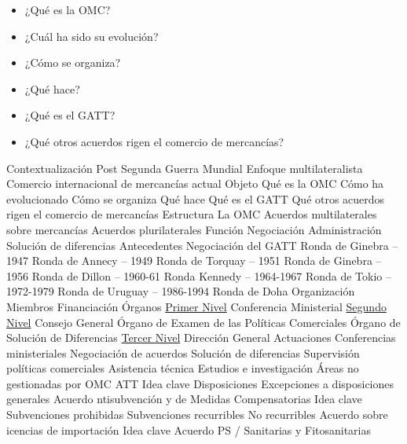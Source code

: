 \documentclass{nuevotema}
\begin{document}
\begin{itemize}
	\item ¿Qué es la OMC?
	\item ¿Cuál ha sido su evolución?
	\item ¿Cómo se organiza?
	\item ¿Qué hace?
	\item ¿Qué es el GATT?
	\item ¿Qué otros acuerdos rigen el comercio de mercancías?
\end{itemize}

\esquemacorto

\begin{esquema}[enumerate]
	\1[] 
		\2 Contextualización
			\3 Post Segunda Guerra Mundial
			\3 Enfoque multilateralista
			\3 Comercio internacional de mercancías actual
		\2 Objeto
			\3 Qué es la OMC
			\3 Cómo ha evolucionado
			\3 Cómo se organiza
			\3 Qué hace
			\3 Qué es el GATT
			\3 Qué otros acuerdos rigen el comercio de mercancías
		\2 Estructura
			\3 La OMC
			\3 Acuerdos multilaterales sobre mercancías
			\3 Acuerdos plurilaterales
	\1 
		\2 Función
			\3 Negociación
			\3 Administración
			\3 Solución de diferencias
		\2 Antecedentes
			\3 Negociación del GATT
			\3 Ronda de Ginebra -- 1947
			\3 Ronda de Annecy -- 1949
			\3 Ronda de Torquay -- 1951
			\3 Ronda de Ginebra -- 1956
			\3 Ronda de Dillon -- 1960-61
			\3 Ronda Kennedy -- 1964-1967
			\3 Ronda de Tokio -- 1972-1979
			\3 Ronda de Uruguay -- 1986-1994
			\3 Ronda de Doha
		\2 Organización
			\3 Miembros
			\3 Financiación
			\3 Órganos
			\3[] \underline{Primer Nivel}
			\3[I] Conferencia Ministerial
			\3 \underline{Segundo Nivel}
			\3[II] Consejo General
			\3[] Órgano de Examen de las Políticas Comerciales
			\3[] Órgano de Solución de Diferencias
			\3[] \underline{Tercer Nivel}
			\3[] Dirección General
		\2 Actuaciones
			\3 Conferencias ministeriales
			\3 Negociación de acuerdos
			\3 Solución de diferencias
			\3 Supervisión políticas comerciales
			\3 Asistencia técnica
			\3 Estudios e investigación
			\3 Áreas no gestionadas por OMC
	\1 
		\2 ATT
			\3 Idea clave
			\3 Disposiciones
			\3 Excepciones a disposiciones generales
		\2 Acuerdo ntisubvención y de Medidas Compensatorias
			\3 Idea clave
			\3 Subvenciones prohibidas
			\3 Subvenciones recurribles
			\3 No recurribles
		\2 Acuerdo sobre icencias de importación
			\3 Idea clave
		\2 Acuerdo PS / Sanitarias y Fitosanitarias

\end{esquema}
\end{document}
